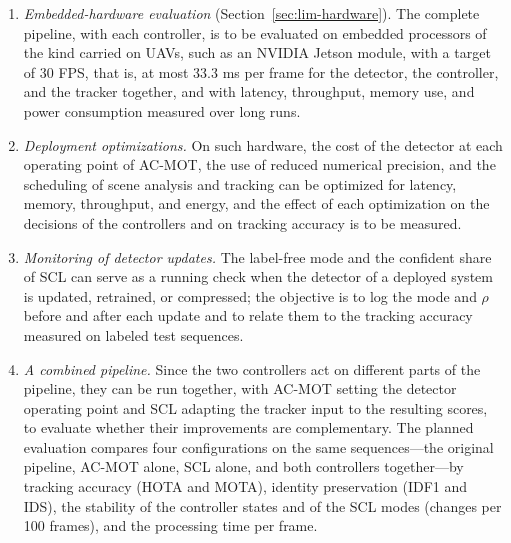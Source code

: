 \begin{enumerate}
\item \emph{Embedded-hardware evaluation} (Section~\ref{sec:lim-hardware}). The complete pipeline, with each controller, is to be evaluated on embedded processors of the kind carried on UAVs, such as an NVIDIA Jetson module, with a target of 30 FPS, that is, at most 33.3 ms per frame for the detector, the controller, and the tracker together, and with latency, throughput, memory use, and power consumption measured over long runs.
\item \emph{Deployment optimizations.} On such hardware, the cost of the detector at each operating point of AC-MOT, the use of reduced numerical precision, and the scheduling of scene analysis and tracking can be optimized for latency, memory, throughput, and energy, and the effect of each optimization on the decisions of the controllers and on tracking accuracy is to be measured.
\item \emph{Monitoring of detector updates.} The label-free mode and the confident share of SCL can serve as a running check when the detector of a deployed system is updated, retrained, or compressed; the objective is to log the mode and $\rho$ before and after each update and to relate them to the tracking accuracy measured on labeled test sequences.
\item \emph{A combined pipeline.} Since the two controllers act on different parts of the pipeline, they can be run together, with AC-MOT setting the detector operating point and SCL adapting the tracker input to the resulting scores, to evaluate whether their improvements are complementary. The planned evaluation compares four configurations on the same sequences---the original pipeline, AC-MOT alone, SCL alone, and both controllers together---by tracking accuracy (HOTA and MOTA), identity preservation (IDF1 and IDS), the stability of the controller states and of the SCL modes (changes per 100 frames), and the processing time per frame.
\end{enumerate}
